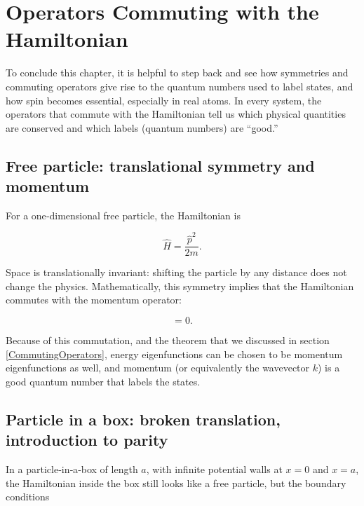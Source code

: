 \documentclass[
  english,
  9pt,
]{extbook}
\theoremstyle{definition}
\theoremstyle{definition}
\theoremstyle{definition}
\theoremstyle{definition}
\theoremstyle{remark}
\begin{document}
\section{Operators Commuting with the Hamiltonian}\label{operators-commuting-with-the-hamiltonian}

To conclude this chapter, it is helpful to step back and see how symmetries and commuting operators give rise to the quantum numbers used to label states, and how spin becomes essential, especially in real atoms. In every system, the operators that commute with the Hamiltonian tell us which physical quantities are conserved and which labels (quantum numbers) are ``good.''

\subsection{Free particle: translational symmetry and momentum}\label{free-particle-translational-symmetry-and-momentum}

For a one‑dimensional free particle, the Hamiltonian is

\begin{equation}
\hat{H} = \frac{\hat{p}^2}{2m}.
\label{eq:spop5} 
\end{equation}

Space is translationally invariant: shifting the particle by any distance does not change the physics. Mathematically, this symmetry implies that the Hamiltonian commutes with the momentum operator:

\begin{equation}
[\hat{H}, \hat{p}] = 0.
\label{eq:spop6} 
\end{equation}

Because of this commutation, and the theorem that we discussed in section \ref{CommutingOperators}, energy eigenfunctions can be chosen to be momentum eigenfunctions as well, and momentum (or equivalently the wavevector \(k\)) is a good quantum number that labels the states.

\subsection{Particle in a box: broken translation, introduction to parity}\label{particle-in-a-box-broken-translation-introduction-to-parity}

In a particle‑in‑a‑box of length \(a\), with infinite potential walls at \(x = 0\) and \(x = a\), the Hamiltonian inside the box still looks like a free particle, but the boundary conditions
\end{document}
